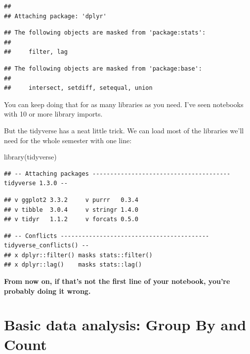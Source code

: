 \documentclass[
]{book}
\newenvironment{Shaded}{\begin{snugshade}}{\end{snugshade}}
\newcommand{\FunctionTok}[1]{\textcolor[rgb]{0.00,0.00,0.00}{#1}}
\newcommand{\NormalTok}[1]{#1}
\begin{document}
\begin{verbatim}
## 
## Attaching package: 'dplyr'
\end{verbatim}

\begin{verbatim}
## The following objects are masked from 'package:stats':
## 
##     filter, lag
\end{verbatim}

\begin{verbatim}
## The following objects are masked from 'package:base':
## 
##     intersect, setdiff, setequal, union
\end{verbatim}

You can keep doing that for as many libraries as you need. I've seen notebooks with 10 or more library imports.

But the tidyverse has a neat little trick. We can load most of the libraries we'll need for the whole semester with one line:

\begin{Shaded}
\begin{Highlighting}[]
\FunctionTok{library}\NormalTok{(tidyverse)}
\end{Highlighting}
\end{Shaded}

\begin{verbatim}
## -- Attaching packages --------------------------------------- tidyverse 1.3.0 --
\end{verbatim}

\begin{verbatim}
## v ggplot2 3.3.2     v purrr   0.3.4
## v tibble  3.0.4     v stringr 1.4.0
## v tidyr   1.1.2     v forcats 0.5.0
\end{verbatim}

\begin{verbatim}
## -- Conflicts ------------------------------------------ tidyverse_conflicts() --
## x dplyr::filter() masks stats::filter()
## x dplyr::lag()    masks stats::lag()
\end{verbatim}

\textbf{From now on, if that's not the first line of your notebook, you're probably doing it wrong.}

\hypertarget{basic-data-analysis-group-by-and-count}{%
\section{Basic data analysis: Group By and Count}\label{basic-data-analysis-group-by-and-count}}
\end{document}
